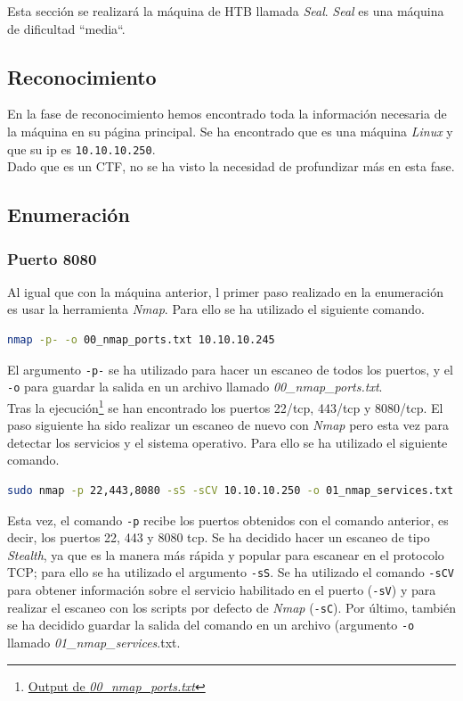 Esta sección se realizará la máquina de \acrlong{HTB} llamada \textit{Seal}\cite{seal}. \textit{Seal} es una máquina de dificultad ``media``.

\subsection{Reconocimiento}
En la fase de reconocimiento hemos encontrado toda la información necesaria de la máquina en su página principal\cite{seal}. Se ha encontrado que es una máquina \textit{Linux} y que su \acrshort{ip} es \texttt{10.10.10.250}.\\

Dado que es un \acrshort{CTF}, no se ha visto la necesidad de profundizar más en esta fase.

\subsection{Enumeración}
\subsubsection{Puerto 8080}
Al igual que con la máquina anterior, l primer paso realizado en la enumeración es usar la herramienta \textit{Nmap}\cite{nmap}. Para ello se ha utilizado el siguiente comando.

\begin{lstlisting}[language=bash]
nmap -p- -o 00_nmap_ports.txt 10.10.10.245
\end{lstlisting}

El argumento \texttt{-p-} se ha utilizado para hacer un escaneo de todos los puertos, y el \texttt{-o} para guardar la salida en un archivo llamado \textit{00\_nmap\_ports.txt}.\\

Tras la ejecución\footnote{\href{https://github.com/VictorNS69/TFM/blob/main/machines/seal/00_nmap_ports.txt}{Output de \textit{00\_nmap\_ports.txt}}} se han encontrado los puertos 22/\acrshort{tcp}, 443/\acrshort{tcp} y 8080/\acrshort{tcp}. El paso siguiente ha sido realizar un escaneo de nuevo con \textit{Nmap} pero esta vez para detectar los servicios y el sistema operativo. Para ello se ha utilizado el siguiente comando.

\begin{lstlisting}[language=bash]
sudo nmap -p 22,443,8080 -sS -sCV 10.10.10.250 -o 01_nmap_services.txt
\end{lstlisting}

Esta vez, el comando \texttt{-p} recibe los puertos obtenidos con el comando anterior, es decir, los puertos 22, 443 y 8080 \acrshort{tcp}. Se ha decidido hacer un escaneo de tipo \textit{Stealth}, ya que es la manera más rápida y popular para escanear en el protocolo TCP; para ello se ha utilizado el argumento \texttt{-sS}. Se ha utilizado el comando \texttt{-sCV} para obtener información sobre el servicio habilitado en el puerto (\texttt{-sV}) y para realizar el escaneo con los scripts por defecto de \textit{Nmap} (\texttt{-sC}). Por último, también se ha decidido guardar la salida del comando en un archivo (argumento \texttt{-o} llamado \textit{01\_nmap\_services}.txt.\\

